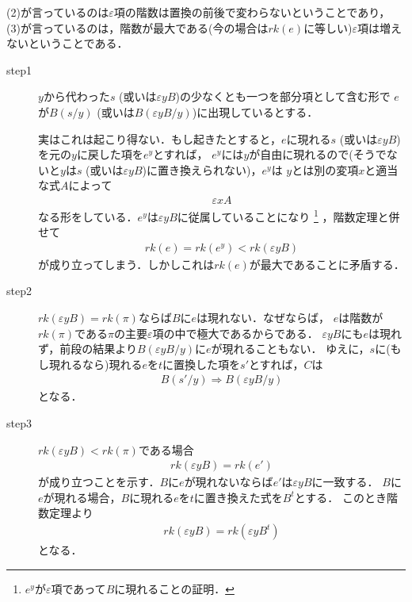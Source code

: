 	(2)が言っているのは$\varepsilon$項の階数は置換の前後で変わらないということであり，
	(3)が言っているのは，階数が最大である(今の場合は$rk(e)$に等しい)$\varepsilon$項は増えないということである．
	
	\begin{metaprf}\mbox{}
		\begin{description}
			\item[step1]
				$y$から代わった$s$ (或いは$\varepsilon y B$)の少なくとも一つを部分項として含む形で
				$e$が$B(s/y)$ (或いは$B(\varepsilon y B/y)$)に出現しているとする．
				
				実はこれは起こり得ない．もし起きたとすると，$e$に現れる$s$ (或いは$\varepsilon y B$)
				を元の$y$に戻した項を$e^{y}$とすれば，
				$e^{y}$には$y$が自由に現れるので(そうでないと$y$は$s$
				(或いは$\varepsilon y B$)に置き換えられない)，$e^{y}$は
				$y$とは別の変項$x$と適当な式$A$によって
				\begin{align}
					\varepsilon x A
				\end{align}
				なる形をしている．$e^{y}$は$\varepsilon y B$に従属していることになり
				\footnote{
					$e^{y}$が$\varepsilon$項であって$B$に現れることの証明．
				}
				，階数定理と併せて
				\begin{align}
					rk(e) = rk(e^{y}) < rk(\varepsilon y B)
				\end{align}
				が成り立ってしまう．しかしこれは$rk(e)$が最大であることに矛盾する．
				
			\item[step2] $rk(\varepsilon y B) = rk(\pi)$ならば$B$に$e$は現れない．なぜならば，
				$e$は階数が$rk(\pi)$である$\pi$の主要$\varepsilon$項の中で極大であるからである．
				$\varepsilon y B$にも$e$は現れず，前段の結果より$B(\varepsilon y B/y)$に$e$が現れることもない．
				ゆえに，$s$に(もし現れるなら)現れる$e$を$t$に置換した項を$s'$とすれば，$C$は
				\begin{align}
					B(s'/y) \Longrightarrow B(\varepsilon y B/y)
				\end{align}
				となる．
			
			\item[step3]
				$rk(\varepsilon y B) < rk(\pi)$である場合
				\begin{align}
					rk(\varepsilon y B) = rk(e')
				\end{align}
				が成り立つことを示す．$B$に$e$が現れないならば$e'$は$\varepsilon y B$に一致する．
				$B$に$e$が現れる場合，$B$に現れる$e$を$t$に置き換えた式を$B^{t}$とする．
				このとき階数定理より
				\begin{align}
					rk(\varepsilon y B) = rk(\varepsilon y B^{t})
				\end{align}
				となる．
				\QED
		\end{description}
	\end{metaprf}
	
